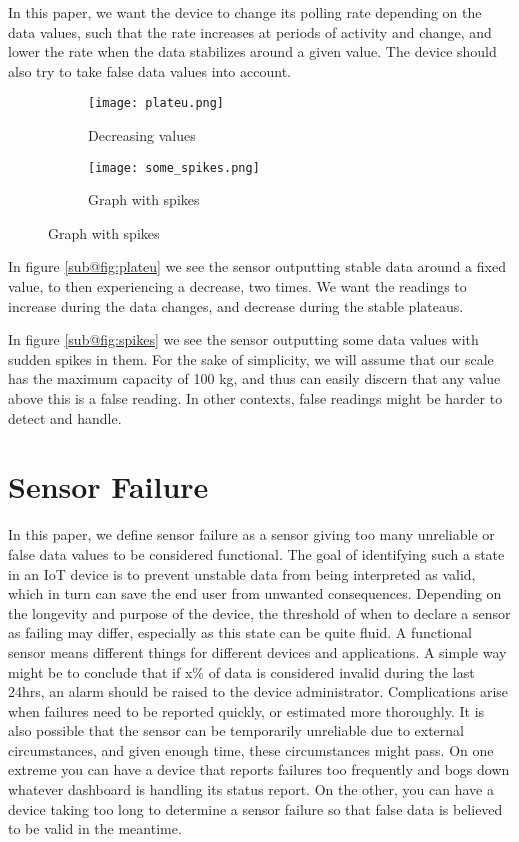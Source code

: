 In this paper, we want the device to change its polling rate depending on the data values, such that the rate increases at periods of activity and change, and lower the rate when the data stabilizes around a given value. The device should also try to take false data values into account.

\begin{figure}[H]
\centering
	\begin{subfigure}[b]{0.3\textwidth}
    \texttt{[image: plateu.png]}
    \caption{Decreasing values}
    \label{fig:plateu}
	\end{subfigure}
	\begin{subfigure}[b]{0.3\textwidth}
    \texttt{[image: some\_spikes.png]}
    \caption{Graph with spikes}
    \label{fig:spikes}
	\end{subfigure}
\end{figure}
In figure \ref{sub@fig:plateu} we see the sensor outputting stable data around a fixed value, to then experiencing a decrease, two times. We want the readings to increase during the data changes, and decrease during the stable plateaus.

In figure \ref{sub@fig:spikes} we see the sensor outputting some data values with sudden spikes in them. For the sake of simplicity, we will assume that our scale has the maximum capacity of 100 kg, and thus can easily discern that any value above this is a false reading. In other contexts, false readings might be harder to detect and handle.

\section{Sensor Failure}
In this paper, we define sensor failure as a sensor giving too many unreliable or false data values to be considered functional. The goal of identifying such a state in an IoT device is to prevent unstable data from being interpreted as valid, which in turn can save the end user from unwanted consequences. Depending on the longevity and purpose of the device, the threshold of when to declare a sensor as failing may differ, especially as this state can be quite fluid. A functional sensor means different things for different devices and applications. A simple way might be to conclude that if x\% of data is considered invalid during the last 24hrs, an alarm should be raised to the device administrator. Complications arise when failures need to be reported quickly, or estimated more thoroughly. It is also possible that the sensor can be temporarily unreliable due to external circumstances, and given enough time, these circumstances might pass. On one extreme you can have a device that reports failures too frequently and bogs down whatever dashboard is handling its status report. On the other, you can have a device taking too long to determine a sensor failure so that false data is believed to be valid in the meantime.


